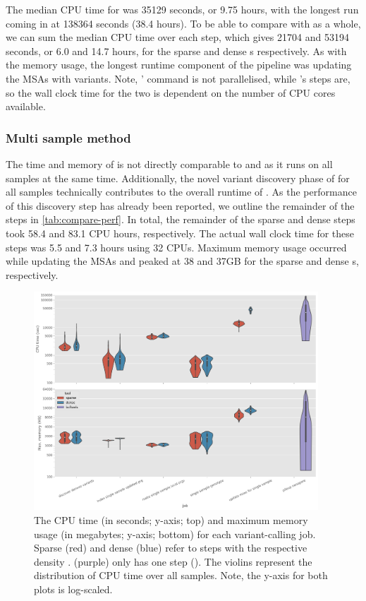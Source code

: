 The median CPU time for \bcftools{} was 35129 seconds, or 9.75 hours, with the longest run coming in at 138364 seconds (38.4 hours). To be able to compare \bcftools{} with \pandora{} as a whole, we can sum the median CPU time over each step, which gives 21704 and 53194 seconds, or 6.0 and 14.7 hours, for the sparse and dense \panrg{}s respectively. As with the memory usage, the longest runtime component of the \pandora{} pipeline was updating the MSAs with \denovo{} variants. Note, \bcftools{}'  command is not parallelised, while \pandora{}'s steps are, so the wall clock time for the two is dependent on the number of CPU cores available. 

\subsubsection{Multi sample method}
The time and memory of \compare{} is not directly comparable to \bcftools{} and \pandora{}  as it runs on all samples at the same time. Additionally, the novel variant discovery phase of \pandora{}  for all samples technically contributes to the overall runtime of \compare{}. As the performance of this discovery step has already been reported, we outline the remainder of the \compare{} steps in \autoref{tab:compare-perf}. In total, the remainder of the sparse and dense \panrg{} steps took 58.4 and 83.1 CPU hours, respectively. The actual wall clock time for these steps was 5.5 and 7.3 hours using 32 CPUs. Maximum memory usage occurred while updating the MSAs and peaked at 38 and 37GB for the sparse and dense \panrg{}s, respectively.

\begin{figure}
     \centering
     \includegraphics[width=0.95\textwidth]{Chapter2/Figs/cpu_and_memory.png}
    \caption{The CPU time (in seconds; y-axis; top) and maximum memory usage (in megabytes; y-axis; bottom) for each \ont{} variant-calling job. Sparse (red) and dense (blue) refer to \pandora{} steps with the respective density \panrg{}.  (purple) only has one step (). The violins represent the distribution of CPU time over all samples. Note, the y-axis for both plots is log-scaled.}
    \label{fig:var-comp-perf}
\end{figure}


